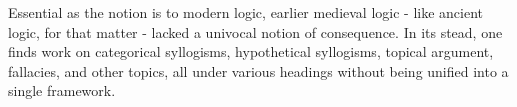 \documentclass[a4paper,11pt]{article}
\begin{document}

Essential as the notion is to modern logic, earlier medieval logic - like ancient logic, for that matter - lacked a univocal notion of consequence. In its stead, one finds work on categorical syllogisms, hypothetical syllogisms, topical argument, fallacies, and other topics, all under various headings without being unified into a single framework. 
\end{document}
